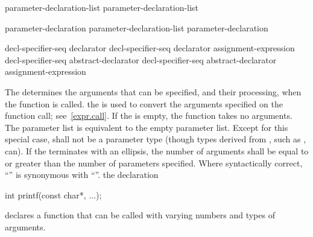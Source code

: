 %
\begin{bnf}
\br
    parameter-declaration-list\opt {}\opt\br
    parameter-declaration-list \terminal{,} 
\end{bnf}

\begin{bnf}
\br
    parameter-declaration\br
    parameter-declaration-list \terminal{,} parameter-declaration
\end{bnf}

\begin{bnf}
\br
    decl-specifier-seq declarator\br
    decl-specifier-seq declarator \terminal{=} assignment-expression\br
    decl-specifier-seq abstract-declarator\opt\br
    decl-specifier-seq abstract-declarator\opt \terminal{=} assignment-expression
\end{bnf}

\pnum
{}%
The
determines the arguments that can be specified, and their processing, when the function is called.
\enternote
{}%
the
is used to convert the arguments specified on the function call;
see~\ref{expr.call}.
\exitnote
{}%
If the
is empty, the function takes no arguments.
The parameter list
is equivalent to the empty parameter list.
%
Except for this special case,
shall not be a parameter type
(though types derived from
,
such as
,
can).
If the
%
%
%
%
%
terminates with an ellipsis, the number of arguments shall be equal
to or greater than the number of parameters specified.
Where syntactically correct,
``''
is synonymous with
``''.
\enterexample
{}%
%
the declaration

\begin{codeblock}
int printf(const char*, ...);
\end{codeblock}

declares a function that can be called with varying numbers and types of arguments.

